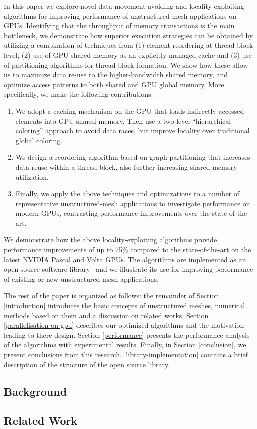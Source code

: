In this paper we explore novel data-movement avoiding and locality exploiting 
algorithms for improving performance of unstructured-mesh applications on GPUs. 
Identifying that the throughput of memory transactions is the main bottleneck, 
we demonstrate how superior execution strategies can be obtained by utilizing 
a combination of techniques from (1) element reordering at thread-block level, 
(2) use of GPU shared memory as an explicitly managed cache and (3) use of 
partitioning algorithms for thread-block formation. We show how these allow us 
to maximize data re-use to the higher-bandwidth shared memory, and optimize 
access patterns to both shared and GPU global memory. More specifically, we make 
the following contributions:
\begin{enumerate}
\item We adopt a caching mechanism on the GPU that loads indirectly accessed 
elements into GPU shared memory. Then use a two-level ``hierarchical coloring'' 
approach to avoid data races, but improve locality over traditional global 
coloring. 

\item We design a reordering algorithm based on graph partitioning that 
increases data reuse within a thread block, also further increasing shared 
memory utilization. 

\item Finally, we apply the above techniques and optimizations to a number of 
representative unstructured-mesh applications to investigate performance on 
modern GPUs, contrasting performance improvements over the state-of-the-art. 
\end{enumerate}

\noindent We demonstrate how the above locality-exploiting algorithms provide 
performance improvements of up to 75\% compared to the state-of-the-art on the 
latest NVIDIA Pascal and Volta GPUs. The algorithms are implemented as an 
open-source software library~\cite{opt-library} and we illustrate 
its use for improving performance of existing or new unstructured-mesh 
applications.

The rest of the paper is organized as follows: the remainder of Section
\ref{introduction} introduces the basic concepts of unstructured meshes, 
numerical methods based on them and a discussion on related works, Section 
\ref{parallelisation-on-gpu} describes our optimized algorithms and the 
motivation leading to there design. Section \ref{performance} presents the 
performance analysis of the algorithms with experimental results. Finally, in 
Section \ref{conclusion}, we present conclusions from this research. 
\ref{library-implementation} contains a brief description of the structure of 
the open source library.


\subsection{Background}\label{sec:background}


\subsection{Related Work}\label{sec:related-works}



